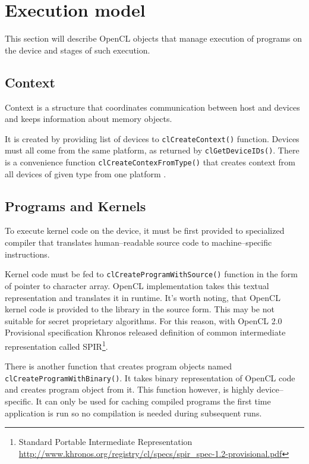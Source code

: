 \section{Execution model}
\label{sec:clexecmodel}

This section will describe OpenCL objects that manage execution of programs on the
device and stages of such execution.

\subsection{Context}

Context is a structure that coordinates communication between host and devices
and keeps information about memory objects. 

It is created by providing list of devices to \texttt{clCreateContext()}
function. Devices must all come from the same platform, as returned by
\texttt{clGetDeviceIDs()}. There is a convenience function \texttt{clCreate\-Contex\-FromType()}
that creates context from all devices of given type from one platform \parencite{openclspec}.

\subsection{Programs and Kernels}

To execute kernel code on the device, it must be first provided to specialized
compiler that translates human--readable source code to machine--specific
instructions.

Kernel code must be fed to \texttt{clCreate\-Program\-WithSource()} function in the form of
pointer to character array. OpenCL implementation takes this textual
representation and translates it in runtime. It's worth noting, that OpenCL kernel
code is provided to the library in the source form. This may be not suitable for
secret proprietary algorithms. For this reason, with OpenCL 2.0 Provisional
specification Khronos released definition of common intermediate
representation called SPIR\footnote{Standard Portable Intermediate Representation
  \url{http://www.khronos.org/registry/cl/specs/spir_spec-1.2-provisional.pdf}}.

There is another function that creates program objects named\\
\texttt{clCreate\-Program\-With\-Binary()}. It takes binary representation of OpenCL
code and creates program object from it. This function however, is highly device--specific. It can only be used
for caching compiled programs the first time application is run so no compilation
is needed during subsequent runs.

